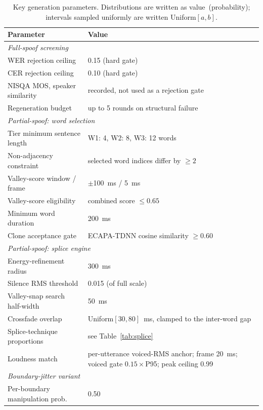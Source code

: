 \documentclass[11pt]{article}
\begin{document}
\begin{table}[t]
\centering
\caption{Key generation parameters. Distributions are written as
value~(probability); intervals sampled uniformly are written
Uniform$[a,b]$.}
\label{tab:params}
\small
\begin{tabular}{p{4.9cm}p{6.6cm}}
\toprule
\textbf{Parameter} & \textbf{Value} \\
\midrule
\multicolumn{2}{l}{\emph{Full-spoof screening}} \\
\midrule
WER rejection ceiling & 0.15 (hard gate) \\
CER rejection ceiling & 0.10 (hard gate) \\
NISQA MOS, speaker similarity & recorded, not used as a rejection gate \\
Regeneration budget & up to 5 rounds on structural failure \\
\midrule
\multicolumn{2}{l}{\emph{Partial-spoof: word selection}} \\
\midrule
Tier minimum sentence length & W1: 4, W2: 8, W3: 12 words \\
Non-adjacency constraint & selected word indices differ by $\geq 2$ \\
Valley-score window / frame & $\pm$\SI{100}{\milli\second} / \SI{5}{\milli\second} \\
Valley-score eligibility & combined score $\leq 0.65$ \\
Minimum word duration & \SI{200}{\milli\second} \\
Clone acceptance gate & ECAPA-TDNN cosine similarity $\geq 0.60$ \\
\midrule
\multicolumn{2}{l}{\emph{Partial-spoof: splice engine}} \\
\midrule
Energy-refinement radius & \SI{300}{\milli\second} \\
Silence RMS threshold & 0.015 (of full scale) \\
Valley-snap search half-width & \SI{50}{\milli\second} \\
Crossfade overlap & Uniform$[30,80]$~ms, clamped to the inter-word gap \\
Splice-technique proportions & see Table~\ref{tab:splice} \\
Loudness match & per-utterance voiced-RMS anchor; frame \SI{20}{\milli\second}; voiced gate $0.15\times$P95; peak ceiling 0.99 \\
\midrule
\multicolumn{2}{l}{\emph{Boundary-jitter variant}} \\
\midrule
Per-boundary manipulation prob. & 0.50 \\

\end{tabular}
\end{table}
\end{document}
